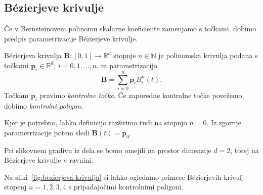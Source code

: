 \documentclass[isrm2, tisk]{fmfdelo}
\newcommand{\R}{\mathbb R}
\newcommand{\N}{\mathbb N}
\newcommand{\p}{\mathbf{p}}
\newcommand{\lilb}[2]{B_{#1}^{#2}(t)}
\newcommand{\bernsteinsump}[2]{\sum_{#1=0}^{#2} \p_{#1}\lilb{#1}{#2}}
\begin{document}
    \subsection{Bézierjeve krivulje}
    Če v Bernsteinovem polinomu skalarne koeficiente zamenjamo s točkami, dobimo predpis parametrizacije Bézierjeve krivulje.
    \begin{definicija}
        Bézierjeva krivulja $\mathbf{B}: [0,1]\to \R^d$ stopnje $n\in\N$ je polinomska krivulja podana s točkami $\p_i\in\R^d$,  $i=0,1,\ldots,n$, in parametrizacijo
        \[\mathbf{B}=\bernsteinsump{i}{n}.\]
        Točkam $\p_i$ pravimo \textit{kontrolne točke}.
        Če zaporedne kontrolne točke povežemo, dobimo \textit{kontrolni poligon}.
    \end{definicija}
    \begin{opomba}
        \label{opomba:dim-0}
        Kjer je potrebno, lahko definicijo razširimo tudi na stopnjo $n=0$.
        Iz zgornje parametrizacije potem sledi $\mathbf{B}(t)=\p_0$.
    \end{opomba}
    \begin{opomba}
        Pri slikovnem gradivu iz dela se bomo omejili na prostor dimenzije $d=2$, torej na Bézierjeve krivulje v ravnini.
    \end{opomba}
    \noindent Na sliki~\ref{fig:bezierjeva-krivulja} si lahko ogledamo primere Bézierjevih krivulj stopenj $n=1,2,3,4$ s pripadajočimi kontrolnimi poligoni.
\end{document}
